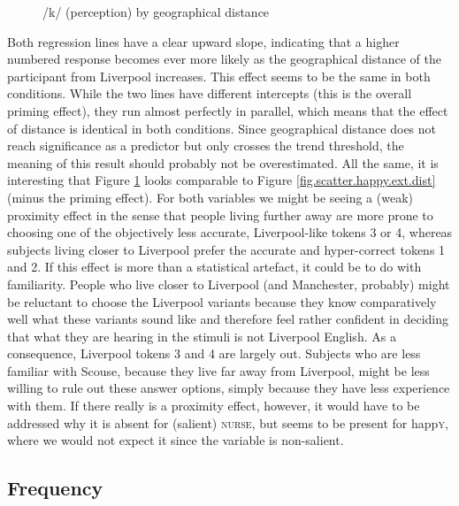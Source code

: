 \begin{figure}[h]
	\centering
		\resizebox{.49\linewidth}{!}{} 
	\caption{/k/ (perception) by geographical distance}
	\label{fig.scatter.k.ext.dist}
\end{figure}

Both regression lines have a clear upward slope, indicating that a higher numbered response becomes ever more likely as the geographical distance of the participant from Liverpool increases.
This effect seems to be the same in both conditions.
While the two lines have different intercepts (this is the overall priming effect), they run almost perfectly in parallel, which means that the effect of distance is identical in both conditions.
Since geographical distance does not reach significance as a predictor but only crosses the trend threshold, the meaning of this result should probably not be overestimated.
All the same, it is interesting that Figure \ref{fig.scatter.k.ext.dist} looks comparable to Figure \ref{fig.scatter.happy.ext.dist} (minus the priming effect).
For both variables we might be seeing a (weak) proximity effect in the sense that people living further away are more prone to choosing one of the objectively less accurate, Liverpool-like tokens 3 or 4, whereas subjects living closer to Liverpool prefer the accurate and hyper-correct tokens 1 and 2.
If this effect is more than a statistical artefact, it could be to do with familiarity.
People who live closer to Liverpool (and Manchester, probably) might be reluctant to choose the Liverpool variants because they know comparatively well what these variants sound like and therefore feel rather confident in deciding that what they are hearing in the stimuli is not Liverpool English.
As a consequence, Liverpool tokens 3 and 4 are largely out.
Subjects who are less familiar with Scouse, because they live far away from Liverpool, might be less willing to rule out these answer options, simply because they have less experience with them.
If there really is a proximity effect, however, it would have to be addressed why it is absent for (salient) \textsc{nurse},  but seems to be present for happ\textsc{y}, where we would not expect it since the variable is non-salient.

\subsection{Frequency}
\label{sec.perc_res.k.frequency}


